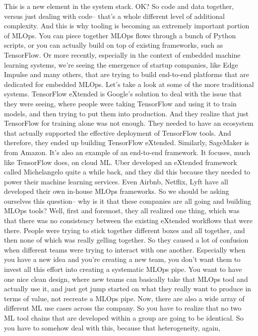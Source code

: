 This is a new element in the system stack.
OK?
So code and data together, versus just dealing
with code-- that's a whole different level of additional complexity.
And this is why tooling is becoming an extremely important portion of MLOps.
You can piece together MLOps flows through a bunch of Python scripts,
or you can actually build on top of existing
frameworks, such as TensorFlow.
Or more recently, especially in the context of embedded machine learning
systems, we're seeing the emergence of startup companies,
like Edge Impulse and many others, that are
trying to build end-to-end platforms that are dedicated for embedded MLOps.
Let's take a look at some of the more traditional systems.
TensorFlow eXtended is Google's solution to deal with the issue
that they were seeing, where people were taking TensorFlow and using
it to train models, and then trying to put them into production.
And they realize that just TensorFlow for training alone was not enough.
They needed to have an ecosystem that actually
supported the effective deployment of TensorFlow tools.
And therefore, they ended up building TensorFlow eXtended.
Similarly, SageMaker is from Amazon.
It's also an example of an end-to-end framework.
It focuses, much like TensorFlow does, on cloud ML.
Uber developed an eXtended framework called Michelangelo quite a while back,
and they did this because they needed to power their machine learning services.
Even Airbnb, Netflix, Lyft have all developed their own in-house MLOps
frameworks.
So we should be asking ourselves this question--
why is it that these companies are all going and building MLOps tools?
Well, first and foremost, they all realized one thing,
which was that there was no consistency between the existing eXtended workflows
that were there.
People were trying to stick together different boxes and all together,
and then none of which was really gelling together.
So they caused a lot of confusion when different teams were
trying to interact with one another.
Especially when you have a new idea and you're creating a new team,
you don't want them to invest all this effort
into creating a systematic MLOps pipe.
You want to have one nice clean design, where new teams can basically
take that MLOps tool and actually use it, and just get
jump started on what they really want to produce in terms of value,
not recreate a MLOps pipe.
Now, there are also a wide array of different ML use
cases across the company.
So you have to realize that no two ML tool
chains that are developed within a group are going to be identical.
So you have to somehow deal with this, because that heterogeneity, again,
